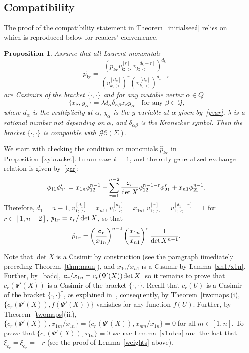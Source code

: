 \documentclass{amsart}
\newtheorem{proposition}[theorem]{Proposition}
\theoremstyle{definition}
\theoremstyle{remark}
\numberwithin{equation}{section}
\numberwithin{theorem}{section}
\def\CC{{\mathcal C}}
\def\G{{\mathcal G}}
\def\GCC{{\G\CC}}
\def\ec{{\tt c}}
\def\Poi{{\{{\cdot},{\cdot}\}}}
\begin{document}
\subsection{Compatibility}
The proof of the compatibility statement in Theorem~\ref{initialseed} relies on~\cite[Proposition~2.1]{GSVnewdouble}
which is reproduced below for readers’ convenience. 

\begin{proposition}\label{compatchar}
Assume that all Laurent monomials 
\[
\hat p_{kr}=\frac{\left(p_{kr}v_{k;>}^{[r]}v_{k;<}^{[d_k-r]}\right)^{d_k}}
{\left(v_{k;>}^{[d_k]}\right)^r \left(v_{k;<}^{[d_k]}\right)^{d_k-r}} 
\]
are Casimirs of the bracket $\Poi$ and for any mutable vertex $\alpha\in Q$
\begin{equation}\label{xybracket}
\{x_\beta,y_\alpha\}=\lambda d_\alpha\delta_{\alpha\beta}x_\beta y_\alpha\quad\text{for any $\beta\in Q$,}
\end{equation}
where $d_\alpha$ is the multiplicity at $\alpha$, $y_\alpha$ is the $y$-variable at $\alpha$ given
 by~{\rm\eqref{yvar}}, $\lambda$ is a rational number not depending on $\alpha$, and $\delta_{\alpha\beta}$ is the Kronecker symbol.
 Then the bracket $\Poi$ is compatible with $\GCC(\Sigma)$.
\end{proposition}

We start with checking the condition on monomials $\hat p_{kr}$ in Proposition~\ref{xybracket}. In our case $k=1$, and the only generalized exchange relation is given by~\eqref{ger}:
\[
\phi_{11}\phi'_{11}=x_{1n}\phi_{12}^{n-1}+\sum_{r=1}^{n-2} \frac{\ec_r}{\det X}\phi_{12}^{n-1-r}\phi_{21}^r+
x_{n1}\phi_{21}^{n-1}.
\]
Therefore, $d_1=n-1$, $v_{1;>}^{[d_1]}=x_{n1}$, $v_{1;<}^{[d_1]}=x_{1n}$, $v_{1;>}^{[r]}=v_{1;<}^{[d_1-r]}=1$ for 
$r\in[1,n-2]$, $p_{1r}=\ec_r/\det X$, so that
\begin{equation}\label{casimir}
\hat p_{1r}=\left(\frac{\ec_r}{x_{1n}}\right)^{n-1}\left(\frac{x_{1n}}{x_{n1}}\right)^r\frac1{\det X^{n-1}}.
\end{equation}

Note that $\det X$ is a Casimir by construction (see the paragraph iimediately preceding Theorem~\ref{thm:main}), and 
$x_{1n}/x_{n1}$ is a Casimir by Lemma~\ref{xn1/x1n}. Further, by~\eqref{badc}, $\ec_r/x_{1n}=c_r(\Psi'(X))\det X$, so it remains to prove that $c_r(\Psi'(X))$ is a Casimir of the bracket $\Poi$. Recall that $c_r(U)$ is a Casimir of the
bracket $\Poi^\dag$, as explained in~\cite[Section 3.2]{GSVnewdouble}, consequently, by Theorem~\ref{twomaps}(i), 
$\{c_r(\Psi'(X)),f(\Psi'(X))\}$ vanishes for any function $f(U)$. Further, by Theorem~\ref{twomaps}(iii), 
$\{c_r(\Psi'(X)),x_{1m}/x_{1n}\}=\{c_r(\Psi'(X)),x_{nm}/x_{1n}\}=0$ for all $m\in[1,n]$. To prove that $\{c_r(\Psi'(X)),x_{1n}\}=0$ we use Lemma~\ref{x1nbra} and the fact that $\xi_{c_r}=\bar\xi_{c_r}=-r$ (see the proof of Lemma~\ref{weights} above).
\end{document}
